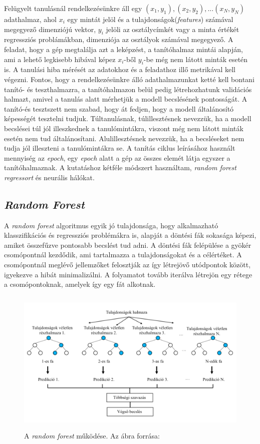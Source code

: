 \documentclass[12pt,letterpaper,oneside,openright]{book}
\begin{document}
\newline \indent
Felügyelt tanulásnál rendelkezésünkre áll egy $(x_1, y_1), (x_2, y_2),...(x_N, y_N)$ adathalmaz, ahol $x_i$ egy mintát jelöl és a tulajdonságok(\textit{features}) számával megegyező dimenziójú vektor, $y_i$ jelöli az osztálycímkét vagy a minta értékét regressziós problámákban, dimenziója az osztályok számával megegyező. A feladat, hogy a gép megtalálja azt a leképzést, a tanítóhalmaz mintái alapján, ami a lehető legkisebb hibával képez $x_i$-ből $y_i$-be még nem látott minták esetén is. A tanulási hiba mérését az adatokhoz és a feladathoz illő metrikával kell végezni. Fontos, hogy a rendelkezésünkre álló adathalmazunkat ketté kell bontani tanító- és teszthalmazra, a tanítóhalmazon belül pedig létrehozhatunk validációs halmazt, amivel a tanulás alatt mérhetjük a modell becslésének pontosságát. A tanító-és tesztszett nem szabad, hogy át fedjen, hogy a modell általánosító képességét tesztelni tudjuk. Túltanulásnak, túlillesztésnek nevezzük, ha a modell becslései túl jól illeszkednek a tanulómintákra, viszont még nem látott minták esetén nem tud általánosítani. Alulillesztésnek nevezzük, ha a becsléseket nem tudja jól illeszteni a tanulómintákra se. A tanítás ciklus leírásához használt mennyiség az \textit{epoch}, egy \textit{epoch} alatt a gép az összes elemét látja egyszer a tanítóhalmaznak.
A kutatáshoz kétféle módszert használtam, \textit{random forest regressort} és neurális hálókat. 
\subsection{\textit{Random Forest}}
A \textit{random forest} algoritmus egyik jó tulajdonsága, hogy alkalmazható klasszifikációs és regressziós problémákra is, alapját a döntési fák sokasága képezi, amiket összefűzve pontosabb becslést tud adni. A döntési fák felépülése a gyökér csomópontnál kezdődik, ami tartalmazza a tulajdonságokat és a célértéket. A csomópontnál meglévő jellemzőket felosztják az így létrejövő utódpontok között, igyekezve a hibát minimalizálni. A folyamatot tovább iterálva létrejön egy rétege a csomópontoknak, amelyek így egy fát alkotnak. 
\begin{figure}[h!]
\centering
\includegraphics[height=70mm]{Figures/rf2.png}
\caption[RF]{A \textit{random forest} működése. Az ábra forrása:\cite{rfp}}
\end{figure}
\end{document}
